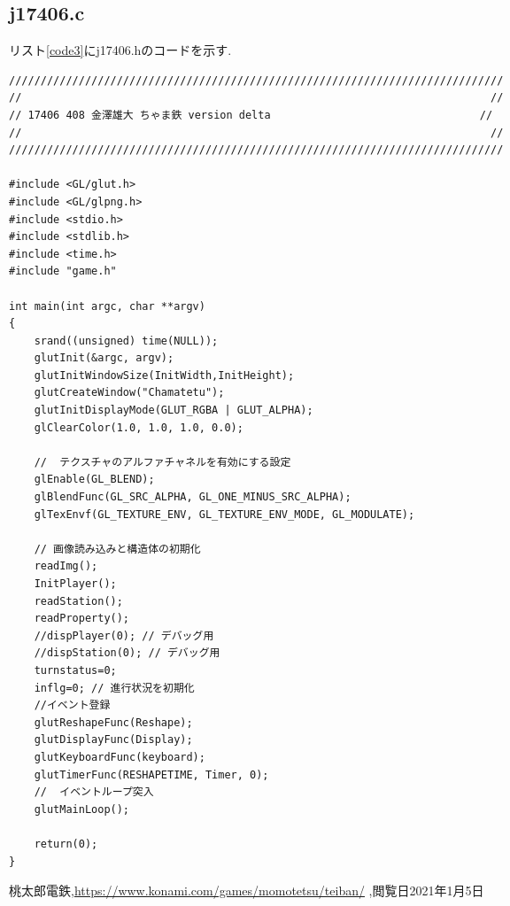 \documentclass[a4j]{jarticle}
\begin{document}
    \subsection{j17406.c}
    リスト\ref{code3}にj17406.hのコードを示す.
    \begin{lstlisting}[basicstyle=\ttfamily\footnotesize, frame=single,label=code3,caption=j17406.c]
//////////////////////////////////////////////////////////////////////////////
//                                                                          //
// 17406 408 金澤雄大 ちゃま鉄 version delta                                 //
//                                                                          //
//////////////////////////////////////////////////////////////////////////////

#include <GL/glut.h>
#include <GL/glpng.h>
#include <stdio.h>
#include <stdlib.h>
#include <time.h>
#include "game.h"

int main(int argc, char **argv)
{
    srand((unsigned) time(NULL));
    glutInit(&argc, argv);
    glutInitWindowSize(InitWidth,InitHeight);
    glutCreateWindow("Chamatetu");
    glutInitDisplayMode(GLUT_RGBA | GLUT_ALPHA);
    glClearColor(1.0, 1.0, 1.0, 0.0);

    //  テクスチャのアルファチャネルを有効にする設定
    glEnable(GL_BLEND);
    glBlendFunc(GL_SRC_ALPHA, GL_ONE_MINUS_SRC_ALPHA);
    glTexEnvf(GL_TEXTURE_ENV, GL_TEXTURE_ENV_MODE, GL_MODULATE);
    
    // 画像読み込みと構造体の初期化
    readImg();
    InitPlayer();
    readStation();
    readProperty();
    //dispPlayer(0); // デバッグ用
    //dispStation(0); // デバッグ用
    turnstatus=0;
    inflg=0; // 進行状況を初期化
    //イベント登録
    glutReshapeFunc(Reshape);
    glutDisplayFunc(Display);
    glutKeyboardFunc(keyboard);
    glutTimerFunc(RESHAPETIME, Timer, 0);
    //  イベントループ突入
    glutMainLoop();

    return(0);
}
    \end{lstlisting}

    \begin{thebibliography}{9}
          桃太郎電鉄,\url{https://www.konami.com/games/momotetsu/teiban/} ,閲覧日2021年1月5日
        \end{thebibliography}
\end{document}
